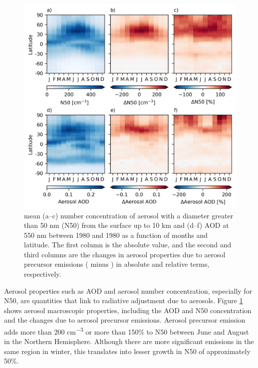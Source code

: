 \begin{figure}
    \centering
    \includegraphics{Chapter4/Figs/seasonal_aerosol_props_1980.png}
    \caption[Mean AOD at 550 nm and N50 between 1980 and 1989 as a function of months and latitude due to aerosol precursor emissions]{mean (a--c) number concentration of aerosol with a diameter greater than 50 nm (N50) from the surface up to 10 km and (d--f) AOD at 550 nm between 1980 and 1980 as a function of months and latitude. The first column is the absolute value, and the second and third columns are the changes in aerosol properties due to aerosol precursor emissions (\histsst{} minus \sstpiaer{}) in absolute and relative terms, respectively.}
    \label{fig:ch4:seasonal-aerosol-props}
\end{figure}


Aerosol properties such as AOD and aerosol number concentration, especially for N50, are quantities that link to radiative adjustment due to aerosols. Figure \ref{fig:ch4:seasonal-aerosol-props} shows aerosol macroscopic properties, including the AOD and N50 concentration and the changes due to aerosol precursor emissions. Aerosol precursor emission adds more than 200 \unit{cm^{-3}} or more than 150\% to N50 between June and August in the Northern Hemisphere. Although there are more significant  emissions in the same region in winter, this translates into lesser growth in N50 of approximately 50\%.


